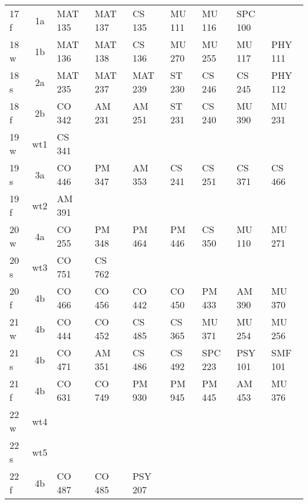 \documentclass[convert]{standalone}
\begin{document}
\begin{tabular}{|l | c | lllllll|}
	\hline
	17 f & 1a & MAT 135 & MAT 137  & CS 135 & MU 111 & MU 116 & SPC 100 & \\
	18 w & 1b & MAT 136 & MAT 138  & CS 136 & MU 270 & MU 255 & MU 117 & PHY 111 \\
	18 s & 2a & MAT 235 & MAT 237 & MAT 239 & ST 230  & CS 246  & CS 245 & PHY 112\\
	18 f & 2b & CO 342 & AM 231 & AM 251 & ST 231 & CS 240 & MU 390 & MU 231  \\
	19 w & wt1 & CS 341 & & & & & & \\
	19 s & 3a & CO 446 & PM 347 & AM 353  & CS 241 & CS 251 & CS 371 & CS 466  \\
	19 f & wt2 & AM 391& & & & & & \\
	20 w & 4a & CO 255 & PM 348 & PM 464 & PM 446 & CS 350  & MU 110 & MU 271  \\
	20 s & wt3 & CO 751 & CS 762 & & & & & \\
	20 f & 4b & CO 466 & CO 456 & CO 442  & CO 450 & PM 433 & AM 390  & MU 370    \\
	21 w & 4b & CO 444 & CO 452 & CS 485  & CS 365 & MU 371  & MU 254 &  MU 256  \\
	21 s & 4b & CO 471 & AM 351 & CS 486 & CS 492  & SPC 223 & PSY 101 & SMF 101\\
	21 f & 4b & CO 631 & CO 749 & PM 930 & PM 945 & PM 445 & AM 453  & MU 376  \\
	22 w & wt4 & & & & & & & \\
	22 s & wt5 & & & & & & & \\
	22 f & 4b & CO 487 & CO 485 & PSY 207 & & & & \\\hline

\end{tabular}
\end{document}

